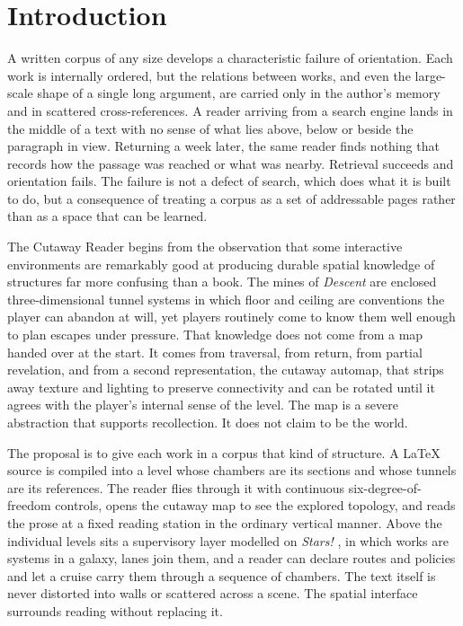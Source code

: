 \documentclass[11pt]{article}
\theoremstyle{remark}
\begin{document}
\newpage

\section{Introduction}
\label{sec:intro}

A written corpus of any size develops a characteristic failure of orientation. Each work is internally ordered, but the relations between works, and even the large-scale shape of a single long argument, are carried only in the author's memory and in scattered cross-references. A reader arriving from a search engine lands in the middle of a text with no sense of what lies above, below or beside the paragraph in view. Returning a week later, the same reader finds nothing that records how the passage was reached or what was nearby. Retrieval succeeds and orientation fails. The failure is not a defect of search, which does what it is built to do, but a consequence of treating a corpus as a set of addressable pages rather than as a space that can be learned.

The Cutaway Reader begins from the observation that some interactive environments are remarkably good at producing durable spatial knowledge of structures far more confusing than a book. The mines of \emph{Descent} \cite{descent} are enclosed three-dimensional tunnel systems in which floor and ceiling are conventions the player can abandon at will, yet players routinely come to know them well enough to plan escapes under pressure. That knowledge does not come from a map handed over at the start. It comes from traversal, from return, from partial revelation, and from a second representation, the cutaway automap, that strips away texture and lighting to preserve connectivity and can be rotated until it agrees with the player's internal sense of the level. The map is a severe abstraction that supports recollection. It does not claim to be the world.

The proposal is to give each work in a corpus that kind of structure. A LaTeX source is compiled into a level whose chambers are its sections and whose tunnels are its references. The reader flies through it with continuous six-degree-of-freedom controls, opens the cutaway map to see the explored topology, and reads the prose at a fixed reading station in the ordinary vertical manner. Above the individual levels sits a supervisory layer modelled on \emph{Stars!} \cite{stars}, in which works are systems in a galaxy, lanes join them, and a reader can declare routes and policies and let a cruise carry them through a sequence of chambers. The text itself is never distorted into walls or scattered across a scene. The spatial interface surrounds reading without replacing it.
\end{document}
